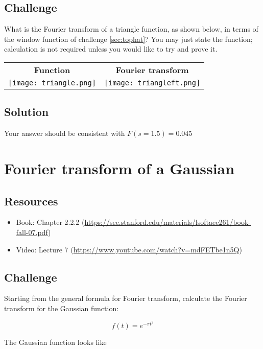 \subsection*{Challenge}
What is the Fourier transform of a triangle function, as shown below, in terms of the window function of challenge \ref{sec:tophat}? You may just state the function; calculation is not required unless you would like to try and prove it.

\begin{tabular}{cc}
    \textbf{Function} & \textbf{Fourier transform} \\
    \texttt{[image: triangle.png]} & \texttt{[image: triangleft.png]}
\end{tabular}

\subsection*{Solution}
Your answer should be consistent with $F(s=1.5) = 0.045$




\newpage
\section{Fourier transform of a Gaussian}

\subsection*{Resources}
\begin{itemize}
    \item Book: Chapter 2.2.2 (\url{https://see.stanford.edu/materials/lsoftaee261/book-fall-07.pdf})
    \item Video: Lecture 7 (\url{https://www.youtube.com/watch?v=mdFETbe1n5Q})
\end{itemize}

\subsection*{Challenge}
Starting from the general formula for Fourier transform, calculate the Fourier transform for the Gaussian function:

\begin{equation}
    f(t) = e^{-\pi t^2}
\end{equation}

The Gaussian function looks like


